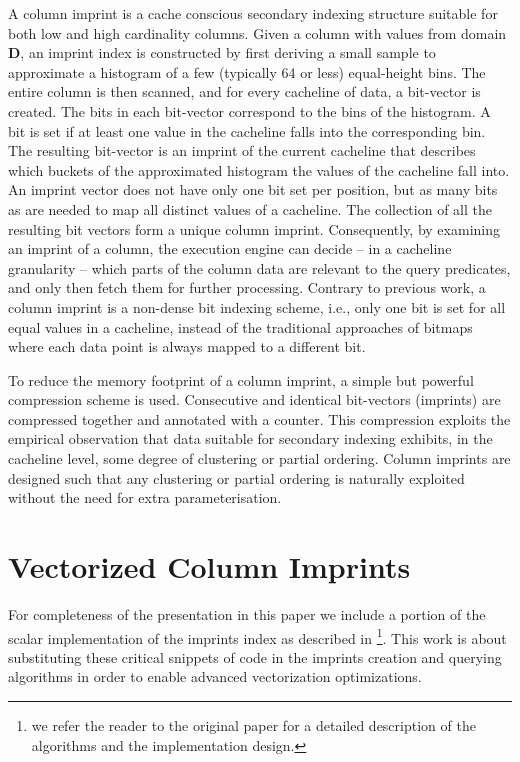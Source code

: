 \documentclass[sigconf]{acmart}
\begin{document}
A column imprint is a cache conscious secondary indexing structure suitable for
both low and high cardinality columns. Given a column with values from
domain $\mathbf{D}$, an imprint index is constructed by first deriving a small
sample to approximate a histogram of a few (typically 64 or less) equal-height
bins. The entire column is then scanned, and for every cacheline of data, a bit-vector is created. The bits in each bit-vector correspond to the bins of the histogram. A bit is set if at least one value in the cacheline falls into
the corresponding bin. The resulting bit-vector is an imprint of the
current cacheline that describes which buckets of the approximated
histogram the values of the cacheline fall into. An imprint vector does not
have only one bit set per position, but as many bits as are needed
to map all distinct values of a cacheline. The collection of
all the resulting bit vectors form a unique column imprint. Consequently,
by examining an imprint of a column, the execution engine 
can decide -- in a cacheline granularity -- which parts of the column
data are relevant to the query predicates, and only then fetch them
for further processing. Contrary to previous work, a column imprint is a
non-dense bit indexing scheme, i.e., only one bit is set for all equal values
in a cacheline, instead of the traditional approaches of bitmaps where each
data point is always mapped to a different bit.

To reduce the memory footprint of a column imprint, a simple but powerful compression scheme is used. Consecutive and identical bit-vectors (imprints)
are compressed together and annotated with a counter. This compression exploits
the empirical observation that data suitable for secondary indexing
exhibits, in the cacheline level, some degree of clustering or partial
ordering. Column imprints are designed such that any clustering or partial
ordering is naturally exploited without the need for extra parameterisation. 

\section{Vectorized Column Imprints}\label{sec:concept}

For completeness of the presentation in this paper we include a portion of the scalar implementation of the imprints index as described in \cite{DBLP:conf/sigmod/SidirourgosK13} \footnote{we refer the reader to the original paper for a detailed description of the algorithms and the implementation design.}.
This work is about substituting these critical snippets of code in the imprints creation and
querying algorithms in order to enable advanced vectorization optimizations.  
\end{document}
